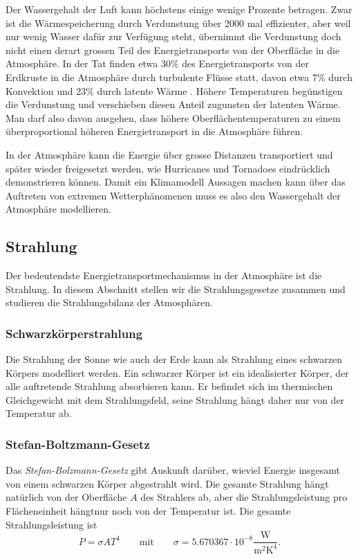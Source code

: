 Der Wassergehalt der Luft kann höchstens einige wenige Prozente betragen.
Zwar ist die Wärmespeicherung durch Verdunstung über 2000 mal effizienter,
aber weil nur wenig Wasser dafür zur Verfügung steht, übernimmt die Verdunstung
doch nicht einen derart grossen Teil des Energietransports von der
Oberfläche in die Atmosphäre.
In der Tat finden etwa 30\% des Energietransports von der Erdkruste
in die Atmosphäre durch turbulente Flüsse statt, davon etwa
7\% durch Konvektion und 23\% durch latente Wärme
\cite[S.~70]{skript:wiefunktioniertdas}.
Höhere Temperaturen begünstigen die Verdunstung und verschieben diesen
Anteil zugunsten der latenten Wärme.
Man darf also davon ausgehen, dass höhere Oberflächentemperaturen
zu einem überproportional höheren Energietransport in die Atmosphäre
führen.

In der Atmosphäre kann die Energie über grosse Distanzen transportiert
und später wieder freigesetzt werden, wie Hurricanes und Tornadoes
eindrücklich demonstrieren können.
Damit ein Klimamodell Aussagen machen kann über das Auftreten von
extremen Wetterphänomenen muss es also den Wassergehalt der
Atmosphäre modellieren.

\subsection{Strahlung}
Der bedeutendste Energietransportmechanismus in der Atmosphäre ist
die Strahlung.
In diesem Abschnitt stellen wir die Strahlungsgesetze zusammen und
studieren die Strahlungsbilanz der Atmosphären.

\subsubsection{Schwarzkörperstrahlung}
%
Die Strahlung der Sonne wie auch der Erde kann als Strahlung eines
schwarzen Körpers modelliert werden.
Ein schwarzer Körper ist ein idealisierter Körper, der alle auftretende
Strahlung absorbieren kann.
Er befindet sich im thermischen Gleichgewicht mit dem Strahlungsfeld,
seine Strahlung hängt daher nur von der Temperatur ab.

\subsubsection{Stefan-Boltzmann-Gesetz}
Das {\em Stefan-Bolzmann-Gesetz} gibt Auskunft darüber, wieviel
Energie insgesamt von einem schwarzen Körper abgestrahlt wird.
Die gesamte Strahlung hängt natürlich von der Oberfläche $A$ des Strahlers ab,
aber die Strahlungsleistung pro Flächeneinheit hängtnur noch von der
Temperatur ist.
Die gesamte Strahlungsleistung ist
\begin{equation}
P=\sigma AT^4
\qquad \text{mit}\qquad
\sigma=5.670367\cdot10^{-8}\frac{\text{W}}{\text{m}^2\text{K}^4}.
\label{skript:stefon-boltzmann}
\end{equation}


